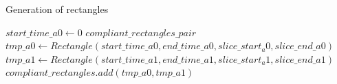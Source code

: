 \documentclass[11pt,a4paper]{article}
\begin{document}
\begin{algorithm}[H]
\caption{Generation of rectangles}\label{rectangles_precomputation}
\begin{algorithmic}[1]
	\State $start\_time\_a0 \gets 0$
	\State $compliant\_rectangles\_pair$
				\State $tmp\_a0 \gets Rectangle(start\_time\_a0, end\_time\_a0,slice\_start_a0,slice\_end\_a0)$
							\State $tmp\_a1 \gets Rectangle(start\_time\_a1, end\_time\_a1,slice\_start_a1,slice\_end\_a1)$
								\State $compliant\_rectangles.add(tmp\_a0, tmp\_a1)$
							\EndIf
						\EndFor
					\EndFor		
				\EndFor
			\EndFor
		\EndFor		
	\EndFor
\EndProcedure
\end{algorithmic}
\end{algorithm}
\end{document}
